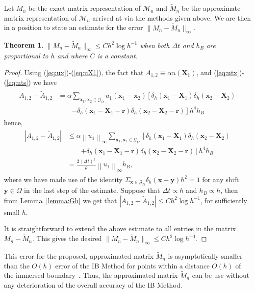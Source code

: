\documentclass[preprint,12pt]{elsarticle}
\newcommand{\norm}[1]{\left\lVert#1\right\rVert}
\newtheorem{theorem}{Theorem}[section]
\begin{document}
Let $M_n$ be the exact matrix representation of $\mathcal{M}_n$ and $\tilde{M}_n$ be the approximate matrix representation of $\mathcal{M}_n$ arrived at via the methods given above. 
We are then in a position to state an estimate for the error $\|M_n-\tilde{M}_n\|_{\infty}$.
\begin{theorem}
\label{thm:A}
$\|M_n-\tilde{M}_n\|_{\infty} \leq C h^2 \log h^{-1}$ when both $\Delta t$ and $h_B$ are  proportional to $h$ and where $C$ is a constant. 
\end{theorem}
\begin{proof}
Using (\ref{eq:ux})-(\ref{eq:uX1}), the fact that $A_{1,2} \equiv \alpha u(\mathbf{X}_1)$, and (\ref{eq:utx})-(\ref{eq:uts}) we have
\begin{align}
\begin{split}
A_{1,2}-\tilde{A}_{1,2} &= 
\alpha\sum_{\mathbf{x}_1,\mathbf{x}_2\in\mathcal{G}_\Omega}
u_1(\mathbf{x}_1 - \mathbf{x}_2)
\left[
\delta_h(\mathbf{x}_1 - \mathbf{X}_1)
\delta_h(\mathbf{x}_2 - \mathbf{X}_2) \right. \\ &\qquad\left.
-
\delta_h(\mathbf{x}_1 - \mathbf{X}_1 - \mathbf{r})
\delta_h(\mathbf{x}_2 - \mathbf{X}_2 - \mathbf{r})
\right]h^4h_B
\end{split}
\end{align}
hence,
\begin{align}
\begin{split}
|A_{1,2}-\tilde{A}_{1,2}|
&\leq 
\alpha\norm{u_1}_\infty
\sum_{\mathbf{x}_1,\mathbf{x}_2\in\mathcal{G}_\Omega}
\left[
\delta_h(\mathbf{x}_1 - \mathbf{X}_1)
\delta_h(\mathbf{x}_2 - \mathbf{X}_2) \right. \\ &\qquad\left.
+
\delta_h(\mathbf{x}_1 - \mathbf{X}_1 - \mathbf{r})
\delta_h(\mathbf{x}_2 - \mathbf{X}_2 - \mathbf{r})
\right]h^4h_B \\
&=
\frac{2(\Delta t)^2}{\rho} \norm{u_1}_\infty h_B,
\end{split}
\end{align}
where we have made use of the identity $\Sigma_{\mathbf{x}\in\mathcal{G}_\Omega}\delta_h(\mathbf{x}-\mathbf{y})h^2=1$ for any shift $\mathbf{y}\in\Omega$ in the last step of the estimate.
Suppose that $\Delta t \propto h$ and $h_B \propto h$, then  from Lemma~\ref{lemma:Gh} we get that 
$|A_{1,2}-\tilde{A}_{1,2}| \leq C h^2 \log h^{-1}$, for sufficiently small
$h$.

It is straightforward to extend the above estimate to all entries in the matrix $M_n-\tilde{M}_n$. This gives the desired $\|M_n-\tilde{M}_n\|_{\infty} \leq C h^2 \log h^{-1}$.
\end{proof}
This error for the proposed, approximated matrix $\tilde{M}_n$
is asymptotically smaller than the $O(h)$ error of the IB Method for points within a distance $O(h)$ of the immersed boundary~\cite{Mori2008}. Thus,  the approximated matrix $\tilde{M}_n$ can be use without any deterioration of the overall accuracy of the IB Method.
\end{document}
